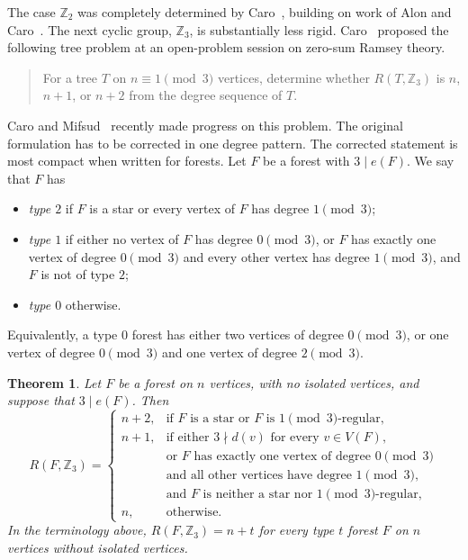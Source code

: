 \documentclass[11pt]{article}
\newtheorem{theorem}{Theorem}[section]
\newcommand{\Z}{\mathbb Z}
\begin{document}
The case $\Z_2$ was completely determined by Caro~\cite{caro1994complete}, building on work of Alon and Caro~\cite{Alon1993-wh}.  The next cyclic group, $\Z_3$, is substantially less rigid.  Caro~\cite{caro2019problem} proposed the following tree problem at an open-problem session on zero-sum Ramsey theory.

\begin{quote}
For a tree $T$ on $n\equiv 1\pmod 3$ vertices, determine whether $R(T,\Z_3)$ is $n$, $n+1$, or $n+2$ from the degree sequence of $T$.
\end{quote}

Caro and Mifsud~\cite{caro2025zero} recently made progress on this problem.  The original formulation has to be corrected in one degree pattern.  The corrected statement is most compact when written for forests.  Let $F$ be a forest with $3\mid e(F)$.  We say that $F$ has
\begin{itemize}[leftmargin=2.2em]
\item \emph{type $2$} if $F$ is a star or every vertex of $F$ has degree $1\pmod 3$;
\item \emph{type $1$} if either no vertex of $F$ has degree $0\pmod 3$, or $F$ has exactly one vertex of degree $0\pmod 3$ and every other vertex has degree $1\pmod 3$, and $F$ is not of type $2$;
\item \emph{type $0$} otherwise.
\end{itemize}
Equivalently, a type $0$ forest has either two vertices of degree $0\pmod 3$, or one vertex of degree $0\pmod 3$ and one vertex of degree $2\pmod 3$.

\begin{theorem}\label{thm:main}
Let $F$ be a forest on $n$ vertices, with no isolated vertices, and suppose that $3\mid e(F)$.  Then
\[
R(F,\Z_3)=
\begin{cases}
 n+2, & \text{if $F$ is a star or $F$ is $1\pmod 3$-regular,}\\[2mm]
 n+1, & \text{if either $3\nmid d(v)$ for every $v\in V(F)$,}\\
      & \text{or $F$ has exactly one vertex of degree $0\pmod 3$}\\
      & \text{and all other vertices have degree $1\pmod 3$,}\\
      & \text{and $F$ is neither a star nor $1\pmod 3$-regular,}\\[2mm]
 n,   & \text{otherwise.}
\end{cases}
\]
In the terminology above, $R(F,\Z_3)=n+t$ for every type $t$ forest $F$ on $n$ vertices without isolated vertices.
\end{theorem}
\end{document}
